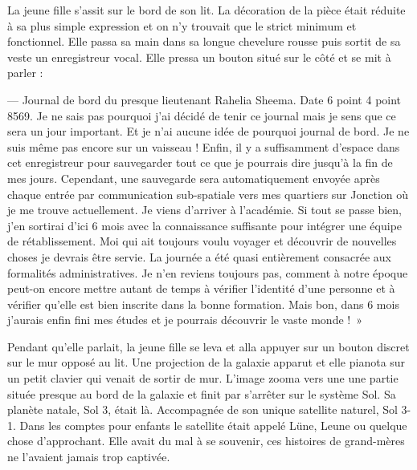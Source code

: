 







\maketitle

La jeune fille s’assit sur le bord de son lit. La décoration de la pièce
était réduite à sa plus simple expression et on n'y trouvait que le
strict minimum et fonctionnel. Elle passa sa main dans sa longue chevelure
rousse puis sortit de sa veste un enregistreur vocal. Elle pressa un bouton
situé sur le côté et se mit à parler :

  — Journal de bord du presque lieutenant Rahelia Sheema. Date 6 point 4 point
8569. Je ne sais pas pourquoi j'ai décidé de tenir ce journal mais je sens que
ce sera un jour important. Et je n'ai aucune idée de pourquoi journal de bord.
Je ne suis même pas encore sur un vaisseau ! Enfin, il y a suffisamment d'espace
dans cet enregistreur pour sauvegarder tout ce que je pourrais dire jusqu'à la
fin de mes jours. Cependant, une sauvegarde sera automatiquement envoyée après
chaque entrée par communication sub-spatiale vers
mes quartiers sur Jonction où je me trouve actuellement. Je viens d'arriver à
l'académie. Si tout se passe bien, j'en sortirai d'ici 6 mois avec la
connaissance suffisante pour intégrer une équipe de rétablissement. Moi qui ait
toujours voulu voyager et découvrir de nouvelles choses je devrais être servie.
La journée a été quasi entièrement consacrée aux formalités administratives. Je
n'en reviens toujours pas, comment à notre époque peut-on encore mettre autant
de temps à vérifier l'identité d'une personne et à vérifier qu'elle est bien
inscrite dans la bonne formation. Mais bon, dans 6 mois j'aurais enfin fini mes
études et je pourrais découvrir le vaste monde ! »

Pendant qu'elle parlait, la jeune fille se leva et alla appuyer sur un bouton 
discret sur le mur opposé au lit. Une projection de la galaxie apparut et elle
pianota sur un petit clavier qui venait de sortir de mur. L'image zooma vers une
une partie située presque au bord de la galaxie et finit par s'arrêter sur le
système Sol. Sa planète natale, Sol 3, était là. Accompagnée de son unique
satellite naturel, Sol 3-1. Dans les comptes pour enfants le satellite était
appelé Lüne, Leune ou quelque chose d'approchant. Elle avait du mal à se
souvenir, ces histoires de grand-mères ne l'avaient jamais trop captivée.

